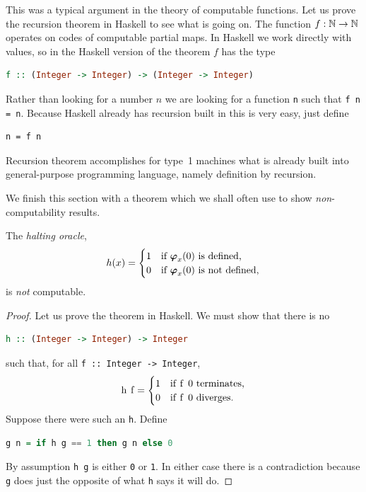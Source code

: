 This was a typical argument in the theory of computable functions. Let
us prove the recursion theorem in Haskell to see what is going on. The
function $f : \mathbb{N} \to \mathbb{N}$ operates on codes of computable partial
maps. In Haskell we work directly with values, so in the Haskell
version of the theorem $f$ has the type
%
\begin{lstlisting}[language=Haskell]
f :: (Integer -> Integer) -> (Integer -> Integer)
\end{lstlisting}
%
Rather than looking for a number $n$ we are looking for a function
\lstinline!n! such that \lstinline!f n = n!. Because Haskell already
has recursion built in this is very easy, just define
%
\begin{lstlisting}
n = f n
\end{lstlisting}
%
Recursion theorem accomplishes for type~1 machines what is already
built into general-purpose programming language, namely definition by
recursion.

We finish this section with a theorem which we shall often use to show
\emph{non}-computability results.

\begin{theorem}
  The \emph{halting oracle},
  \begin{equation*}
    h(x) =
    \begin{cases}
      1 & \text{if $\text{\boldmath{$\varphi$}}_{x}(0)$ is defined,}\\
      0 & \text{if $\text{\boldmath{$\varphi$}}_{x}(0)$ is not defined,}
    \end{cases}
  \end{equation*}
  is \emph{not} computable.
\end{theorem}

\begin{proof}
  Let us prove the theorem in Haskell. We must show that there is no
  \begin{lstlisting}[language=Haskell]
h :: (Integer -> Integer) -> Integer
  \end{lstlisting}
  such that, for all \lstinline!f :: Integer -> Integer!,
  \begin{equation*}
    \text{\lstinline!h f!} =
    \begin{cases}
      \text{\lstinline!1!} & \text{if \lstinline!f 0! terminates,}\\
      \text{\lstinline!0!} & \text{if \lstinline!f 0! diverges.}
    \end{cases}
  \end{equation*}
  Suppose there were such an \lstinline!h!. Define
  \begin{lstlisting}[language=Haskell]
g n = if h g == 1 then g n else 0
  \end{lstlisting}
  By assumption \lstinline!h g! is either \lstinline!0! or
  \lstinline!1!. In either case there is a contradiction because
  \lstinline!g! does just the opposite of what \lstinline!h! says it
  will do.
\end{proof}


